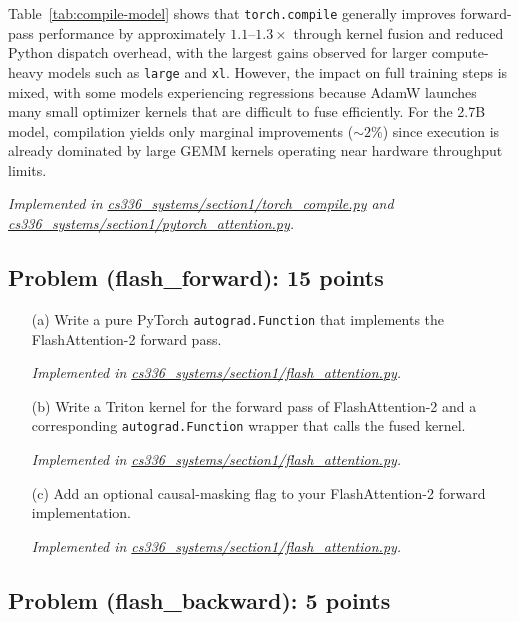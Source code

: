 \documentclass[letterpaper]{article}
\newcommand{\repofile}[2]{\href{https://github.com/echung32/ece405-assignment4-hpc/blob/main/#1}{#2}}
\begin{document}
\begin{itemize}
		Table~\ref{tab:compile-model} shows that \texttt{torch.compile} generally improves forward-pass performance by approximately \(1.1\text{--}1.3\times\) through kernel fusion and reduced Python dispatch overhead, with the largest gains observed for larger compute-heavy models such as \texttt{large} and \texttt{xl}. However, the impact on full training steps is mixed, with some models experiencing regressions because AdamW launches many small optimizer kernels that are difficult to fuse efficiently. For the 2.7B model, compilation yields only marginal improvements (\(\sim2\%\)) since execution is already dominated by large GEMM kernels operating near hardware throughput limits.
	\end{itemize}
		
	\textit{Implemented in \repofile{cs336_systems/section1/torch_compile.py}{cs336\_systems/section1/torch\_compile.py} and \repofile{cs336_systems/section1/pytorch_attention.py}{cs336\_systems/section1/pytorch\_attention.py}.}
	
	\subsection{Problem (flash\_forward): 15 points}
	
	\begin{itemize}
		\item[(a)] Write a pure PyTorch \texttt{autograd.Function} that implements the FlashAttention-2 forward pass.
		
		\textit{Implemented in \repofile{cs336_systems/section1/flash_attention.py}{cs336\_systems/section1/flash\_attention.py}.}
		
		\item[(b)] Write a Triton kernel for the forward pass of FlashAttention-2 and a corresponding \texttt{autograd.Function} wrapper that calls the fused kernel.
		
		\textit{Implemented in \repofile{cs336_systems/section1/flash_attention.py}{cs336\_systems/section1/flash\_attention.py}.}
		
		\item[(c)] Add an optional causal-masking flag to your FlashAttention-2 forward implementation.
		
		\textit{Implemented in \repofile{cs336_systems/section1/flash_attention.py}{cs336\_systems/section1/flash\_attention.py}.}
	\end{itemize}
	
	\subsection{Problem (flash\_backward): 5 points}
	
\end{document}
